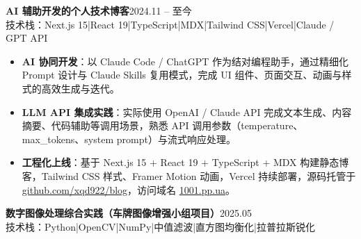 \documentclass[10pt,a4paper]{article}
\newcommand{\projectblock}[3]{%
    {\bfseries\color{darktext}#1}\hfill{\color{graytext}#2}\\%
    {\small\color{graytext}#3}%
    \vspace{0.2em}%
}
\begin{document}
\vspace{0.15em}

\projectblock{AI 辅助开发的个人技术博客}{2024.11 -- 至今}{技术栈：Next.js 15\hspace{0.3em}|\hspace{0.3em}React 19\hspace{0.3em}|\hspace{0.3em}TypeScript\hspace{0.3em}|\hspace{0.3em}MDX\hspace{0.3em}|\hspace{0.3em}Tailwind CSS\hspace{0.3em}|\hspace{0.3em}Vercel\hspace{0.3em}|\hspace{0.3em}Claude / GPT API}

\begin{itemize}[leftmargin=1.5em, itemsep=2pt, parsep=0pt, topsep=2pt]
    \item \textbf{AI 协同开发}：以 Claude Code / ChatGPT 作为结对编程助手，通过精细化 Prompt 设计与 Claude Skills 复用模式，完成 UI 组件、页面交互、动画与样式的高效生成与迭代。
    \item \textbf{LLM API 集成实践}：实际使用 OpenAI / Claude API 完成文本生成、内容摘要、代码辅助等调用场景，熟悉 API 调用参数（temperature、max\_tokens、system prompt）与流式响应处理。
    \item \textbf{工程化上线}：基于 Next.js 15 + React 19 + TypeScript + MDX 构建静态博客，Tailwind CSS 样式、Framer Motion 动画，Vercel 持续部署，源码托管于 \href{https://github.com/xqd922/blog}{github.com/xqd922/blog}，访问域名 \href{https://1001.pp.ua}{1001.pp.ua}。
\end{itemize}

\vspace{0.15em}

\projectblock{数字图像处理综合实践（车牌图像增强小组项目）}{2025.05}{技术栈：Python\hspace{0.3em}|\hspace{0.3em}OpenCV\hspace{0.3em}|\hspace{0.3em}NumPy\hspace{0.3em}|\hspace{0.3em}中值滤波\hspace{0.3em}|\hspace{0.3em}直方图均衡化\hspace{0.3em}|\hspace{0.3em}拉普拉斯锐化}
\end{document}

